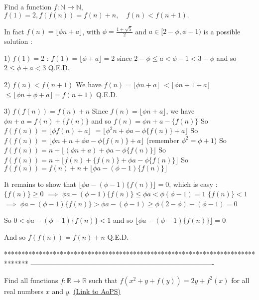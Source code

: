 \begin{mysolution}
	\begin{tcolorbox}Find a function $ f: \mathbb{N}\to \mathbb{N}$, $ f(1)=2,f(f(n))=f(n)+n,\quad f(n)<f(n+1).$\end{tcolorbox}

In fact  $ f(n)=\lfloor\phi n+a\rfloor$, with $ \phi =\frac{1+\sqrt 5 }{2}$ and $ a\in[2-\phi,\phi-1)$ is a possible solution :

1) $ f(1)=2$ :
$ f(1)=\lfloor\phi+a\rfloor=2$ since $ 2-\phi\leq a<\phi-1<3-\phi$ and so $ 2\leq \phi+a<3$
Q.E.D.

2) $ f(n)<f(n+1)$
We have $ f(n)=\lfloor\phi n+a\rfloor$ $ < \lfloor\phi n+1+a\rfloor$ $ \leq \lfloor\phi n+\phi+a\rfloor = f(n+1)$
Q.E.D.

3) $ f(f(n))=f(n)+n$
Since $ f(n)=\lfloor\phi n+a\rfloor$, we have $ \phi n+a=f(n)+\{f(n)\}$ and so $ f(n)=\phi n+a-\{f(n)\}$
So $ f(f(n))=\lfloor\phi f(n)+a\rfloor$ $ =\lfloor\phi^{2}n+\phi a-\phi\{f(n)\}+a\rfloor$
So $ f(f(n))=\lfloor\phi n+n+\phi a-\phi\{f(n)\}+a\rfloor$ (remember $ \phi^{2}=\phi+1$)
So $ f(f(n))=n+\lfloor(\phi n+a)+\phi a-\phi\{f(n)\}\rfloor$
So $ f(f(n))=n+\lfloor f(n)+\{f(n)\}+\phi a-\phi\{f(n)\}\rfloor$
So $ f(f(n))=f(n)+n+\lfloor \phi a-(\phi-1)\{f(n)\}\rfloor$

It remains to show that $ \lfloor \phi a-(\phi-1)\{f(n)\}\rfloor=0$, which is easy :
$ \{f(n)\}\geq 0$ $ \implies$ $ \phi a-(\phi-1)\{f(n)\}\leq \phi a <\phi(\phi-1)=1$
$ \{f(n)\}< 1$ $ \implies$ $ \phi a-(\phi-1)\{f(n)\}>\phi a-(\phi-1)\geq \phi(2-\phi)-(\phi-1)=0$

So $ 0<\phi a-(\phi-1)\{f(n)\}<1$ and so $ \lfloor \phi a-(\phi-1)\{f(n)\}\rfloor=0$

And so $ f(f(n))=f(n)+n$
Q.E.D.
\end{mysolution}
*******************************************************************************
-------------------------------------------------------------------------------

\begin{problem}
	Find all functions $ f : \mathbb{R}\rightarrow \mathbb{R}$ such that $ f(x^{2}+y+f(y)) = 2y+f^{2}(x)$ for all real numbers $ x$ and $ y$.
	\flushright \href{https://artofproblemsolving.com/community/c6h161554}{(Link to AoPS)}
\end{problem}




